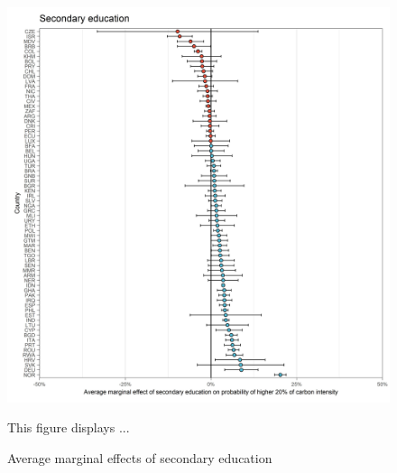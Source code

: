 \documentclass[12pt, a4paper]{article}
\newenvironment{subcaption}
{\strut
\vspace{-5pt}
\begin{minipage}[b]{0.9\textwidth}
  \hspace*{-\parindent}
  \footnotesize}
 {\end{minipage}}
\begin{document}
 \begin{figure}[ht!]
   \centering
   \caption{Average marginal effects of secondary education} \label{fig:F10_sec_edu}
   \includegraphics{Analysis_Logit_Models_Marginal_Effects/Average_Marginal_Effects_affected_upper_80_secondary_education}
   \begin{subcaption}
     This figure displays ...
   \end{subcaption}
 \end{figure}

 \clearpage
\end{document}

